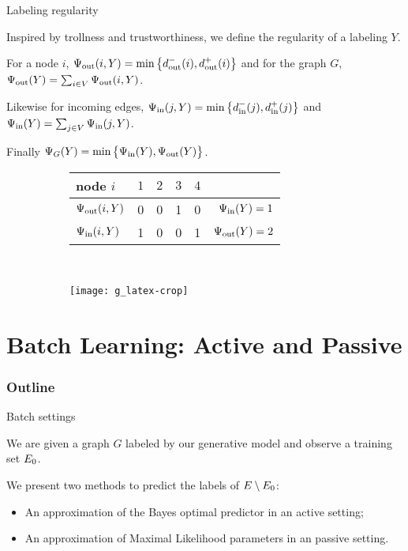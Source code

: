 \documentclass[10pt,svgnames,ignorenonframetext,final]{beamer}
\providecommand{\largelist}{%
  \setlength{\itemsep}{8pt}\setlength{\parskip}{3pt}}
\begin{document}
\begin{frame}{Labeling regularity}

Inspired by trollness and trustworthiness, we define
the regularity of a labeling \(Y\).

For a node \(i\),
$\Psi_{\mathrm{out}}(i, Y) = \min\big\{d_{\mathrm{out}}^-(i),d_{\mathrm{out}}^+(i)\big\}$ and for the
graph \(G\), $\Psi_{\mathrm{out}}(Y) = \sum_{i \in V} \Psi_{\mathrm{out}}(i,Y)$.

Likewise for
incoming edges, \(\Psi_{\mathrm{in}}(j,Y) = \min\big\{d_{\mathrm{in}}^-(j),d_{\mathrm{in}}^+(j)\big\}\)
and \(\Psi_{\mathrm{in}}(Y) = \sum_{j \in V} \Psi_{\mathrm{in}}(j,Y)\).

Finally
\(\Psi_G(Y) = \min\big\{\Psi_{\mathrm{in}}(Y), \Psi_{\mathrm{out}}(Y)\big\}\).

\begin{figure}[t]
  \centering
  \begin{subfigure}[t]{0.6\textwidth}
    \centering
    \vspace{-2cm}
    \begin{tabular}{lcccc|r}
      \toprule
      node $i$        & $1$ & $2$ & $3$ & $4$ &                  \\
      \midrule
      $\Psi_{\mathrm{out}}(i, Y)$ & 0   & 0   & 1   & 0   & $\Psi_{\mathrm{in}}(Y) = 1$  \\
      $\Psi_{\mathrm{in}}(i, Y)$  & 1   & 0   & 0   & 1   & $\Psi_{\mathrm{out}}(Y) = 2$ \\
      \bottomrule
    \end{tabular}
  \end{subfigure}~
  \begin{subfigure}[t]{0.35\textwidth}
    \centering \texttt{[image: g\_latex-crop]}
  \end{subfigure}
\end{figure}

\end{frame}



\section{Batch Learning: Active and Passive}\label{batch-setting}
  \begin{frame} \frametitle{Outline} \tableofcontents[currentsection] \end{frame}

\begin{frame}{Batch settings}

We are given a graph \(G\) labeled by our generative model and observe a training set $E_0$.

We present two methods to predict the labels of $E \setminus E_0$:
\begin{itemize}
  \largelist
\item An approximation of the Bayes optimal predictor in an \alert{active setting};
\item An approximation of Maximal Likelihood parameters in an \alert{passive setting}.
\end{itemize}

\end{frame}
\end{document}
